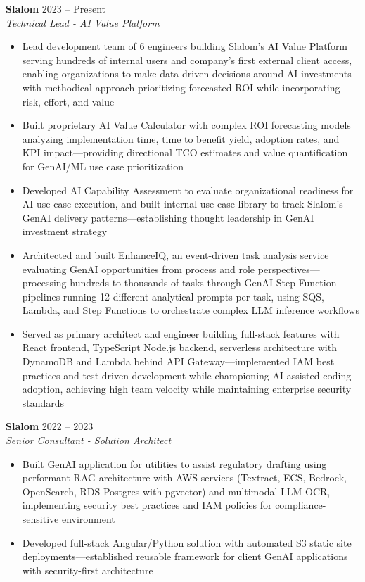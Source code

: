 \documentclass[11pt,letterpaper]{article}
\begin{document}
\noindent\textbf{\textcolor{primary}{Slalom}} \hfill \textcolor{lighttext}{2023 – Present}\\
\textit{\textcolor{accent}{Technical Lead - AI Value Platform}}
\begin{itemize}
    \item\small\textcolor{darktext}{Lead development team of 6 engineers building Slalom's AI Value Platform serving hundreds of internal users and company's first external client access, enabling organizations to make data-driven decisions around AI investments with methodical approach prioritizing forecasted ROI while incorporating risk, effort, and value}
    \item\small\textcolor{darktext}{Built proprietary AI Value Calculator with complex ROI forecasting models analyzing implementation time, time to benefit yield, adoption rates, and KPI impact—providing directional TCO estimates and value quantification for GenAI/ML use case prioritization}
    \item\small\textcolor{darktext}{Developed AI Capability Assessment to evaluate organizational readiness for AI use case execution, and built internal use case library to track Slalom's GenAI delivery patterns—establishing thought leadership in GenAI investment strategy}
    \item\small\textcolor{darktext}{Architected and built EnhanceIQ, an event-driven task analysis service evaluating GenAI opportunities from process and role perspectives—processing hundreds to thousands of tasks through GenAI Step Function pipelines running 12 different analytical prompts per task, using SQS, Lambda, and Step Functions to orchestrate complex LLM inference workflows}
    \item\small\textcolor{darktext}{Served as primary architect and engineer building full-stack features with React frontend, TypeScript Node.js backend, serverless architecture with DynamoDB and Lambda behind API Gateway—implemented IAM best practices and test-driven development while championing AI-assisted coding adoption, achieving high team velocity while maintaining enterprise security standards}
\end{itemize}
\vspace{6pt}

\noindent\textbf{\textcolor{primary}{Slalom}} \hfill \textcolor{lighttext}{2022 – 2023}\\
\textit{\textcolor{accent}{Senior Consultant - Solution Architect}}
\begin{itemize}
    \item\small\textcolor{darktext}{Built GenAI application for utilities to assist regulatory drafting using performant RAG architecture with AWS services (Textract, ECS, Bedrock, OpenSearch, RDS Postgres with pgvector) and multimodal LLM OCR, implementing security best practices and IAM policies for compliance-sensitive environment}
    \item\small\textcolor{darktext}{Developed full-stack Angular/Python solution with automated S3 static site deployments—established reusable framework for client GenAI applications with security-first architecture}
\end{itemize}
\vspace{6pt}
\end{document}
